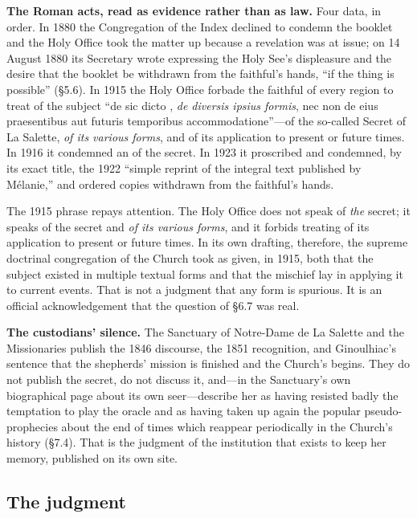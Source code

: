 \textbf{The Roman acts, read as evidence rather than as law.} Four
data, in order. In 1880 the Congregation of the Index declined to
condemn the booklet and the Holy Office took the matter up because a
revelation was at issue; on 14 August 1880 its Secretary wrote
expressing the Holy See's displeasure and the desire that the
booklet be withdrawn from the faithful's hands, ``if the thing is
possible'' (\S5.6). In 1915 the Holy Office forbade the faithful of
every region to treat of the subject ``de sic dicto , \emph{de diversis ipsius formis}, nec non de eius
praesentibus aut futuris temporibus accommodatione''---of the
so-called Secret of La Salette, \emph{of its various forms}, and of
its application to present or future times. In 1916 it condemned an
 of the secret. In 1923 it proscribed and condemned,
by its exact title, the 1922 ``simple reprint of the integral text
published by Mélanie,'' and ordered copies withdrawn from the
faithful's hands.

The 1915 phrase repays attention. The Holy Office does not speak of
\emph{the} secret; it speaks of the secret and \emph{of its various
forms}, and it forbids treating of its application to present or
future times. In its own drafting, therefore, the supreme doctrinal
congregation of the Church took as given, in 1915, both that the
subject existed in multiple textual forms and that the mischief lay
in applying it to current events. That is not a judgment that any
form is spurious. It is an official acknowledgement that the
question of \S6.7 was real.

\textbf{The custodians' silence.} The Sanctuary of Notre-Dame de La
Salette and the Missionaries publish the 1846 discourse, the 1851
recognition, and Ginoulhiac's sentence that the shepherds' mission
is finished and the Church's begins. They do not publish the secret,
do not discuss it, and---in the Sanctuary's own biographical page
about its own seer---describe her as having resisted badly the
temptation to play the oracle and as having taken up again the
popular pseudo-prophecies about the end of times which reappear
periodically in the Church's history (\S7.4). That is the judgment
of the institution that exists to keep her memory, published on its
own site.

\subsection{The judgment}

